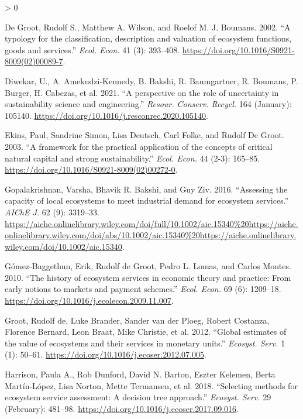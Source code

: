 \documentclass[
]{article}
\newlength{\cslhangindent}
\newenvironment{CSLReferences}[2] %
 {%
  \setlength{\parindent}{0pt}
  \ifodd #1 \everypar{\setlength{\hangindent}{\cslhangindent}}\ignorespaces\fi
  \ifnum #2 > 0
  \setlength{\parskip}{#2\baselineskip}
  \fi
 }%
 {}
\begin{document}
\begin{CSLReferences}{1}{0}
\leavevmode\hypertarget{ref-DeGroot2002}{}%
De Groot, Rudolf S., Matthew A. Wilson, and Roelof M. J. Boumans. 2002. {``{A typology for the classification, description and valuation of ecosystem functions, goods and services}.''} \emph{Ecol. Econ.} 41 (3): 393--408. \url{https://doi.org/10.1016/S0921-8009(02)00089-7}.

\leavevmode\hypertarget{ref-Diwekar2021}{}%
Diwekar, U., A. Amekudzi-Kennedy, B. Bakshi, R. Baumgartner, R. Boumans, P. Burger, H. Cabezas, et al. 2021. {``{A perspective on the role of uncertainty in sustainability science and engineering}.''} \emph{Resour. Conserv. Recycl.} 164 (January): 105140. \url{https://doi.org/10.1016/j.resconrec.2020.105140}.

\leavevmode\hypertarget{ref-Ekins2003}{}%
Ekins, Paul, Sandrine Simon, Lisa Deutsch, Carl Folke, and Rudolf De Groot. 2003. {``{A framework for the practical application of the concepts of critical natural capital and strong sustainability}.''} \emph{Ecol. Econ.} 44 (2-3): 165--85. \url{https://doi.org/10.1016/S0921-8009(02)00272-0}.

\leavevmode\hypertarget{ref-Gopalakrishnan2016}{}%
Gopalakrishnan, Varsha, Bhavik R. Bakshi, and Guy Ziv. 2016. {``{Assessing the capacity of local ecosystems to meet industrial demand for ecosystem services}.''} \emph{AIChE J.} 62 (9): 3319--33. \url{https://aiche.onlinelibrary.wiley.com/doi/full/10.1002/aic.15340\%20https://aiche.onlinelibrary.wiley.com/doi/abs/10.1002/aic.15340\%20https://aiche.onlinelibrary.wiley.com/doi/10.1002/aic.15340}.

\leavevmode\hypertarget{ref-Gomez-Baggethun2010}{}%
Gómez-Baggethun, Erik, Rudolf de Groot, Pedro L. Lomas, and Carlos Montes. 2010. {``{The history of ecosystem services in economic theory and practice: From early notions to markets and payment schemes}.''} \emph{Ecol. Econ.} 69 (6): 1209--18. \url{https://doi.org/10.1016/j.ecolecon.2009.11.007}.

\leavevmode\hypertarget{ref-DeGroot2012}{}%
Groot, Rudolf de, Luke Brander, Sander van der Ploeg, Robert Costanza, Florence Bernard, Leon Braat, Mike Christie, et al. 2012. {``{Global estimates of the value of ecosystems and their services in monetary units}.''} \emph{Ecosyst. Serv.} 1 (1): 50--61. \url{https://doi.org/10.1016/j.ecoser.2012.07.005}.

\leavevmode\hypertarget{ref-Harrison2018}{}%
Harrison, Paula A., Rob Dunford, David N. Barton, Eszter Kelemen, Berta Martín-López, Lisa Norton, Mette Termansen, et al. 2018. {``{Selecting methods for ecosystem service assessment: A decision tree approach}.''} \emph{Ecosyst. Serv.} 29 (February): 481--98. \url{https://doi.org/10.1016/j.ecoser.2017.09.016}.


\end{CSLReferences}
\end{document}
